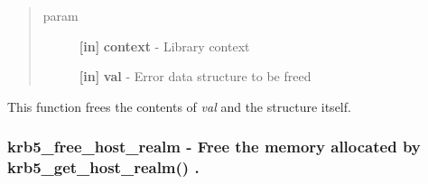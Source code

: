 \documentclass[letterpaper,10pt,english]{sphinxmanual}
\begin{document}
\begin{fulllineitems}
\label{appdev/refs/api/krb5_free_error:c.krb5_free_error}
\end{fulllineitems}

\begin{quote}\begin{description}
\item[{param}] \leavevmode
\textbf{{[}in{]}} \textbf{context} - Library context

\textbf{{[}in{]}} \textbf{val} - Error data structure to be freed

\end{description}\end{quote}

This function frees the contents of \emph{val} and the structure itself.


\subsubsection{krb5\_free\_host\_realm -  Free the memory allocated by krb5\_get\_host\_realm() .}
\label{appdev/refs/api/krb5_free_host_realm::doc}\label{appdev/refs/api/krb5_free_host_realm:krb5-free-host-realm-free-the-memory-allocated-by-krb5-get-host-realm}

\begin{fulllineitems}
\label{appdev/refs/api/krb5_free_host_realm:c.krb5_free_host_realm}
\end{fulllineitems}
\end{document}
